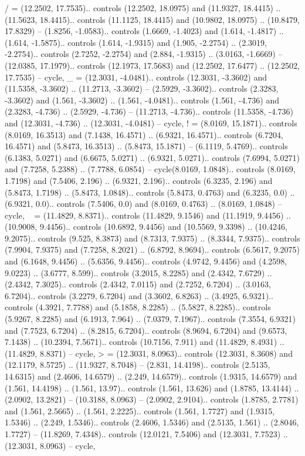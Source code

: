 {/} = {(12.2502, 17.7535).. controls (12.2502, 18.0975) and (11.9327, 18.4415) .. (11.5623, 18.4415).. controls (11.1125, 18.4415) and (10.9802, 18.0975) .. (10.8479, 17.8329) -- (1.8256, -1.0583).. controls (1.6669, -1.4023) and (1.614, -1.4817) .. (1.614, -1.5875).. controls (1.614, -1.9315) and (1.905, -2.2754) .. (2.3019, -2.2754).. controls (2.7252, -2.2754) and (2.884, -1.9315) .. (3.0163, -1.6669) -- (12.0385, 17.1979).. controls (12.1973, 17.5683) and (12.2502, 17.6477) .. (12.2502, 17.7535) -- cycle},
{_} = {(12.3031, -4.0481).. controls (12.3031, -3.3602) and (11.5358, -3.3602) .. (11.2713, -3.3602) -- (2.5929, -3.3602).. controls (2.3283, -3.3602) and (1.561, -3.3602) .. (1.561, -4.0481).. controls (1.561, -4.736) and (2.3283, -4.736) .. (2.5929, -4.736) -- (11.2713, -4.736).. controls (11.5358, -4.736) and (12.3031, -4.736) .. (12.3031, -4.0481) -- cycle},
{!} = {(8.0169, 15.1871).. controls (8.0169, 16.3513) and (7.1438, 16.4571) .. (6.9321, 16.4571).. controls (6.7204, 16.4571) and (5.8473, 16.3513) .. (5.8473, 15.1871) -- (6.1119, 5.4769).. controls (6.1383, 5.0271) and (6.6675, 5.0271) .. (6.9321, 5.0271).. controls (7.6994, 5.0271) and (7.7258, 5.2388) .. (7.7788, 6.0854) -- cycle(8.0169, 1.0848).. controls (8.0169, 1.7198) and (7.5406, 2.196) .. (6.9321, 2.196).. controls (6.3235, 2.196) and (5.8473, 1.7198) .. (5.8473, 1.0848).. controls (5.8473, 0.4763) and (6.3235, 0.0) .. (6.9321, 0.0).. controls (7.5406, 0.0) and (8.0169, 0.4763) .. (8.0169, 1.0848) -- cycle},
{~} = {(11.4829, 8.8371).. controls (11.4829, 9.1546) and (11.1919, 9.4456) .. (10.9008, 9.4456).. controls (10.6892, 9.4456) and (10.5569, 9.3398) .. (10.4246, 9.2075).. controls (9.525, 8.3873) and (8.7313, 7.9375) .. (8.3344, 7.9375).. controls (7.9904, 7.9375) and (7.7258, 8.2021) .. (6.8792, 8.9694).. controls (6.5617, 9.2075) and (6.1648, 9.4456) .. (5.6356, 9.4456).. controls (4.9742, 9.4456) and (4.2598, 9.0223) .. (3.6777, 8.599).. controls (3.2015, 8.2285) and (2.4342, 7.6729) .. (2.4342, 7.3025).. controls (2.4342, 7.0115) and (2.7252, 6.7204) .. (3.0163, 6.7204).. controls (3.2279, 6.7204) and (3.3602, 6.8263) .. (3.4925, 6.9321).. controls (4.3921, 7.7788) and (5.1858, 8.2285) .. (5.5827, 8.2285).. controls (5.9267, 8.2285) and (6.1913, 7.964) .. (7.0379, 7.1967).. controls (7.3554, 6.9321) and (7.7523, 6.7204) .. (8.2815, 6.7204).. controls (8.9694, 6.7204) and (9.6573, 7.1438) .. (10.2394, 7.5671).. controls (10.7156, 7.911) and (11.4829, 8.4931) .. (11.4829, 8.8371) -- cycle},
{>} = {(12.3031, 8.0963).. controls (12.3031, 8.3608) and (12.1179, 8.5725) .. (11.9327, 8.7048) -- (2.831, 14.4198).. controls (2.5135, 14.6315) and (2.4606, 14.6579) .. (2.249, 14.6579).. controls (1.9315, 14.6579) and (1.561, 14.4198) .. (1.561, 13.97).. controls (1.561, 13.626) and (1.8785, 13.4144) .. (2.0902, 13.2821) -- (10.3188, 8.0963) -- (2.0902, 2.9104).. controls (1.8785, 2.7781) and (1.561, 2.5665) .. (1.561, 2.2225).. controls (1.561, 1.7727) and (1.9315, 1.5346) .. (2.249, 1.5346).. controls (2.4606, 1.5346) and (2.5135, 1.561) .. (2.8046, 1.7727) -- (11.8269, 7.4348).. controls (12.0121, 7.5406) and (12.3031, 7.7523) .. (12.3031, 8.0963) -- cycle},
